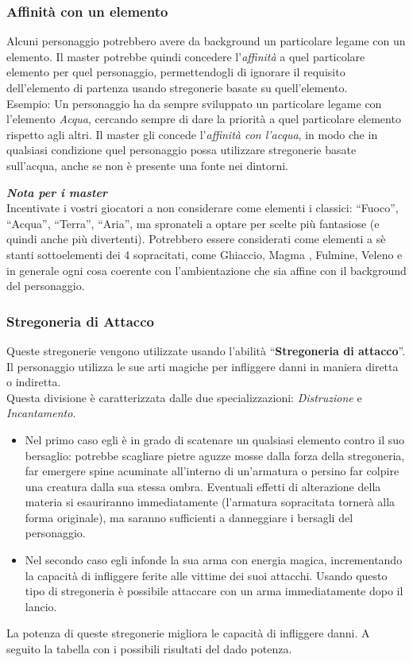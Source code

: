 \documentclass[../manuale_main.tex]{subfiles}
\begin{document}
\subsubsection{Affinità con un elemento}
Alcuni personaggio potrebbero avere da background un particolare legame con un elemento. Il master potrebbe quindi concedere l'\emph{affinità} a quel particolare elemento per quel personaggio, permettendogli di ignorare il requisito dell'elemento di partenza usando stregonerie basate su quell'elemento.\\
Esempio: Un personaggio ha da sempre sviluppato un particolare legame con l'elemento \emph{Acqua}, cercando sempre di dare la priorità a quel particolare elemento rispetto agli altri. Il master gli concede l'\emph{affinità con l'acqua}, in modo che in qualsiasi condizione quel personaggio possa utilizzare stregonerie basate sull'acqua, anche se non è presente una fonte nei dintorni.
\begin{framed}
\textbf{\textit{Nota per i master}}\\
Incentivate i vostri giocatori a non considerare come elementi i classici: ``Fuoco'', ``Acqua'', ``Terra'', ``Aria'', ma spronateli a optare per scelte più fantasiose (e quindi anche più divertenti). Potrebbero essere considerati come elementi a sè stanti sottoelementi dei 4 sopracitati, come Ghiaccio, Magma , Fulmine, Veleno e in generale ogni cosa coerente con l'ambientazione che sia affine con il background del personaggio.
\end{framed}
\clearpage
\subsubsection{Stregoneria di Attacco}
Queste stregonerie vengono utilizzate usando l'abilità ``\textbf{Stregoneria di attacco}''.\\
Il personaggio utilizza le sue arti magiche per infliggere danni in maniera diretta o indiretta. \\
Questa divisione è caratterizzata dalle due specializzazioni: \emph{Distruzione} e \emph{Incantamento}.\\
\begin{itemize}
\item Nel primo caso egli è in grado di scatenare un qualsiasi elemento contro il suo bersaglio: potrebbe scagliare pietre aguzze mosse dalla forza della stregoneria, far emergere spine acuminate all'interno di un'armatura o persino far colpire una creatura dalla sua stessa ombra. Eventuali effetti di alterazione della materia si esauriranno immediatamente (l'armatura sopracitata tornerà alla forma originale), ma saranno sufficienti a danneggiare i bersagli del personaggio.
\item Nel secondo caso egli infonde la sua arma con energia magica, incrementando la capacità di infliggere ferite alle vittime dei suoi attacchi. Usando questo tipo di stregoneria è possibile attaccare con un arma immediatamente dopo il lancio.
\end{itemize}
La potenza di queste stregonerie migliora le capacità di infliggere danni. A seguito la tabella con i possibili risultati del dado potenza.\\
\end{document}
